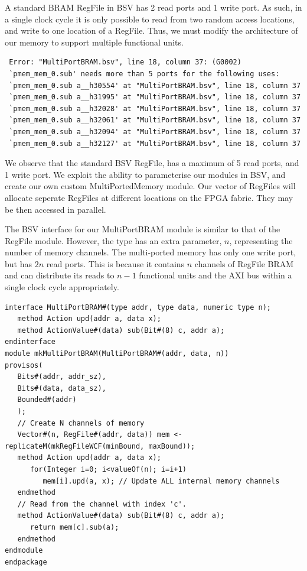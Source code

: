 \documentclass[a4paper,8pt]{report}
\begin{document}
A standard BRAM RegFile in BSV has 2 read ports and 1 write port. As such, in a
single clock cycle it is only possible to read from two random access locations,
and write to one location of a RegFile. Thus, we must modify the architecture of
our memory to support multiple functional units.

\scriptsize
\begin{verbatim}
 Error: "MultiPortBRAM.bsv", line 18, column 37: (G0002)
 `pmem_mem_0.sub' needs more than 5 ports for the following uses:
 `pmem_mem_0.sub a__h30554' at "MultiPortBRAM.bsv", line 18, column 37
 `pmem_mem_0.sub a__h31995' at "MultiPortBRAM.bsv", line 18, column 37
 `pmem_mem_0.sub a__h32028' at "MultiPortBRAM.bsv", line 18, column 37
 `pmem_mem_0.sub a__h32061' at "MultiPortBRAM.bsv", line 18, column 37
 `pmem_mem_0.sub a__h32094' at "MultiPortBRAM.bsv", line 18, column 37
 `pmem_mem_0.sub a__h32127' at "MultiPortBRAM.bsv", line 18, column 37
\end{verbatim}
\normalsize
We observe that the standard BSV RegFile, has a maximum of 5 read ports, and 1
write port. We exploit the ability to parameterise our modules in BSV, and
create our own custom MultiPortedMemory module. Our vector of RegFiles will
allocate seperate RegFiles at different locations on the FPGA fabric. They may
be then accessed in parallel.

The BSV interface for our MultiPortBRAM module is similar to that of the RegFile
module. However, the type has an extra parameter, $n$, representing the number of memory
channels. The multi-ported memory has only one write port, but has $2n$ read
ports. This is because it contains $n$ channels of RegFile BRAM and can
distribute its reads to $n-1$ functional units and the AXI bus within a single
clock cycle appropriately.

\scriptsize
\begin{verbatim}
interface MultiPortBRAM#(type addr, type data, numeric type n);
   method Action upd(addr a, data x);
   method ActionValue#(data) sub(Bit#(8) c, addr a);
endinterface
module mkMultiPortBRAM(MultiPortBRAM#(addr, data, n))
provisos(
   Bits#(addr, addr_sz),
   Bits#(data, data_sz),
   Bounded#(addr)
   );
   // Create N channels of memory
   Vector#(n, RegFile#(addr, data)) mem <- replicateM(mkRegFileWCF(minBound, maxBound));
   method Action upd(addr a, data x);
      for(Integer i=0; i<valueOf(n); i=i+1)
         mem[i].upd(a, x); // Update ALL internal memory channels
   endmethod
   // Read from the channel with index 'c'.
   method ActionValue#(data) sub(Bit#(8) c, addr a);
      return mem[c].sub(a);
   endmethod
endmodule
endpackage
\end{verbatim}
\normalsize
\end{document}
